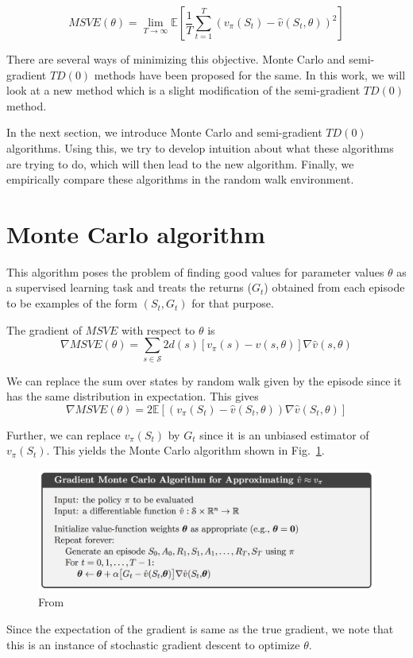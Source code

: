 \documentclass{article}
\begin{document}
\begin{equation}\label{eqn1}
MSVE(\theta) =  \lim_{T \rightarrow \infty} \mathbb{E} \left[ \frac{1}{T} \sum_{t=1}^{T} {\left( v_{\pi}(S_t) - \hat{v}(S_t, \theta) \right)}^2 \right]
\end{equation}

There are several ways of minimizing this objective. Monte Carlo and semi-gradient $TD(0)$ methods have been proposed for the same. In this work, we will look at a new method which is a slight modification of the semi-gradient $TD(0)$ method.

In the next section, we introduce Monte Carlo and semi-gradient $TD(0)$ algorithms. Using this, we try to develop intuition about what these algorithms are trying to do, which will then lead to the new algorithm. Finally, we empirically compare these algorithms in the random walk environment.

\section{Monte Carlo algorithm}

This algorithm poses the problem of finding good values for parameter values $\theta$ as a supervised learning task and treats the returns ($G_t$) obtained from each episode to be examples of the form $(S_t, G_t)$ for that purpose.

The gradient of $MSVE$ with respect to $\theta$ is
$$\nabla MSVE(\theta) = \sum_{s \in \mathcal{S}} 2 d(s) \left[ v_{\pi}(s) - \hat{v}(s, \theta) \right] \nabla \hat{v}(s, \theta) $$

We can replace the sum over states by random walk given by the episode since it has the same distribution in expectation. This gives
$$\nabla MSVE(\theta) = 2 \mathbb{E} \left[ \left( v_{\pi}(S_t) - \hat{v}(S_t, \theta) \right) \nabla \hat{v}(S_t, \theta) \right] $$

Further, we can replace $v_{\pi}(S_t)$ by $G_t$ since it is an unbiased estimator of $v_{\pi}(S_t)$. This yields the Monte Carlo algorithm shown in Fig.~\ref{fig:mc_alg}.
\begin{figure}[ht!]
    \centering
    \includegraphics[width=\textwidth]{mc_alg}
    \caption{From~\cite{RLbook}}\label{fig:mc_alg}
\end{figure}
Since the expectation of the gradient is same as the true gradient, we note that this is an instance of stochastic gradient descent to optimize $\theta$.
\end{document}
